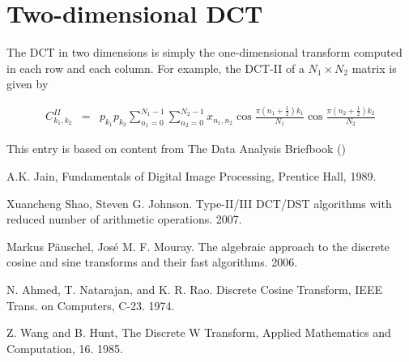 \documentclass{article}
\begin{document}
\section{Two-dimensional DCT}

The DCT in two dimensions is simply the one-dimensional transform computed in each row and each column. For example, the DCT-II of a $N_1\times N_2$ matrix is given by

\begin{eqnarray*}
C^{II}_{k_1,k_2}&=&p_{k_1}p_{k_2}\sum _{n_1=0}^{N_1-1}\sum _{n_2=0}^{N_2-1} x_{n_1,n_2} \cos \frac{\pi\left( n_1+\frac{1}{2}\right) k_1}{N_1}  \cos \frac{\pi\left( n_2+\frac{1}{2}\right) k_2}{N_2}
\end{eqnarray*}

\begin{thebibliography}{3}

 This entry is based on content from The Data Analysis Briefbook
()

 A.K. Jain, Fundamentals of Digital Image Processing, Prentice Hall, 1989.

 Xuancheng Shao, Steven G. Johnson. Type-II/III DCT/DST algorithms with reduced number of arithmetic operations. 2007.

 Markus P\"auschel, Jos\'e M. F. Mouray. The algebraic approach to the discrete cosine and
sine transforms and their fast algorithms. 2006.

 N. Ahmed, T. Natarajan, and K. R. Rao. Discrete Cosine Transform, IEEE Trans. on
Computers, C-23. 1974.

 Z. Wang and B. Hunt, The Discrete W Transform, Applied Mathematics and Computation,
16. 1985.

\end{thebibliography}
\end{document}
